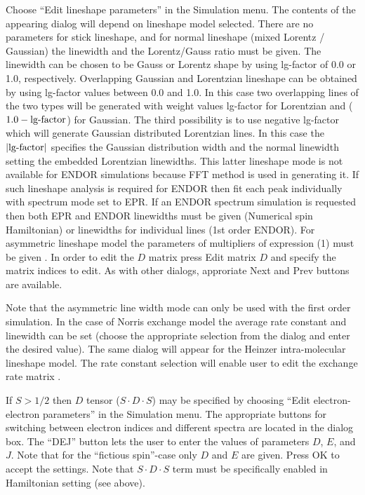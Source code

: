 \documentclass[byrevtex,amssymb,aps,pra,floatfix,letterpaper]{revtex4}
\begin{document}
Choose ``Edit lineshape parameters'' in the Simulation menu. The contents of the appearing dialog will depend on lineshape model selected. There are no parameters for stick lineshape, and for normal lineshape (mixed Lorentz / Gaussian) the linewidth and the Lorentz/Gauss ratio must be given. The linewidth can be chosen to be Gauss or Lorentz shape by using lg-factor of 0.0 or 1.0, respectively. Overlapping Gaussian and Lorentzian lineshape can be obtained by using lg-factor values between 0.0 and 1.0. In this case two overlapping lines of the two types will be generated with weight values lg-factor for Lorentzian and ($1.0 - \textnormal{lg-factor}$) for Gaussian. The third possibility is to use negative lg-factor which will generate Gaussian distributed Lorentzian lines. In this case the $\left| \textnormal{lg-factor}\right|$ specifies the Gaussian distribution width and the normal linewidth setting the embedded Lorentzian linewidths. This latter lineshape mode is not available for ENDOR simulations because FFT method is used in generating it. If such lineshape analysis is required for ENDOR then fit each peak individually with spectrum mode set to EPR. If an ENDOR spectrum simulation is requested then both EPR and ENDOR linewidths must be given (Numerical spin Hamiltonian) or linewidths for individual lines (1st order ENDOR). For asymmetric lineshape model the parameters of multipliers of expression (1) must be given \cite{bolton}. In order to edit the $D$ matrix press Edit matrix $D$ and specify the matrix indices to edit. As with other dialogs, approriate Next and Prev buttons are available.

Note that the asymmetric line width mode can only be used with the first order simulation. In the case of Norris exchange model the average rate constant and linewidth can be set (choose the appropriate selection from the dialog and enter the desired value). The same dialog will appear for the Heinzer intra-molecular lineshape model. The rate constant selection will enable user to edit the exchange rate matrix \cite{heinzer}.

If $S > 1/2$ then $D$ tensor ($S\cdot D\cdot S$) may be specified by choosing ``Edit electron-electron parameters'' in the Simulation menu. The appropriate buttons for switching between electron indices and different spectra are located in the dialog box. The ``DEJ'' button lets the user to enter the values of parameters $D$, $E$, and $J$. Note that for the ``fictious spin''-case only $D$ and $E$ are given. Press OK to accept the settings. Note that $S\cdot D\cdot S$ term must be specifically enabled in Hamiltonian setting (see above).
\end{document}
